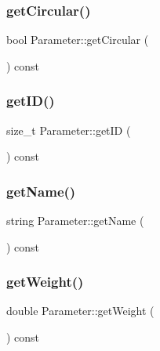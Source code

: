 \subsubsection{\texorpdfstring{get\+Circular()}{getCircular()}}
{\footnotesize\ttfamily bool Parameter\+::get\+Circular (\begin{DoxyParamCaption}{ }\end{DoxyParamCaption}) const}

\mbox{\label{class_parameter_a12c2b322265422eea431043dd50f047d}} 
\subsubsection{\texorpdfstring{get\+I\+D()}{getID()}}
{\footnotesize\ttfamily size\+\_\+t Parameter\+::get\+ID (\begin{DoxyParamCaption}{ }\end{DoxyParamCaption}) const}

\mbox{\label{class_parameter_aedb83bcd926fb8df7dc5ee31a1066baa}} 
\subsubsection{\texorpdfstring{get\+Name()}{getName()}}
{\footnotesize\ttfamily string Parameter\+::get\+Name (\begin{DoxyParamCaption}{ }\end{DoxyParamCaption}) const}

\mbox{\label{class_parameter_a2fcb32200dafaa276b7a1ca61f135f72}} 
\subsubsection{\texorpdfstring{get\+Weight()}{getWeight()}}
{\footnotesize\ttfamily double Parameter\+::get\+Weight (\begin{DoxyParamCaption}{ }\end{DoxyParamCaption}) const}

\mbox{\label{class_parameter_a4f7b83d21a705a91947da01166c3f799}} 
